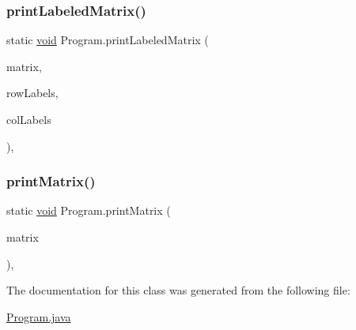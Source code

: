 \mbox{\label{class_program_a656988b2d7a7272ac8d6bf5fdaf8da00}} 
\subsubsection{\texorpdfstring{print\+Labeled\+Matrix()}{printLabeledMatrix()}}
{\footnotesize\ttfamily static \hyperlink{lp__lib_8h_ac7828c7b2b31d2e11af17bdb6289c5d9}{void} Program.\+print\+Labeled\+Matrix (\begin{DoxyParamCaption}\item[{Double\+Matrix}]{matrix,  }\item[{String\+Vector}]{row\+Labels,  }\item[{String\+Vector}]{col\+Labels }\end{DoxyParamCaption})\hspace{0.3cm}{\ttfamily [inline]}, {\ttfamily [static]}}

\mbox{\label{class_program_a9a10d587a6565cb7eba7da994fa1a9dd}} 
\subsubsection{\texorpdfstring{print\+Matrix()}{printMatrix()}}
{\footnotesize\ttfamily static \hyperlink{lp__lib_8h_ac7828c7b2b31d2e11af17bdb6289c5d9}{void} Program.\+print\+Matrix (\begin{DoxyParamCaption}\item[{Double\+Matrix}]{matrix }\end{DoxyParamCaption})\hspace{0.3cm}{\ttfamily [inline]}, {\ttfamily [static]}}



The documentation for this class was generated from the following file\+:\begin{DoxyCompactItemize}
\item 
\hyperlink{_program_8java}{Program.\+java}\end{DoxyCompactItemize}
